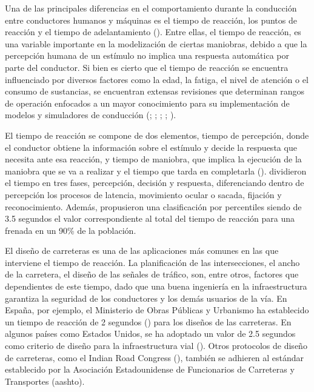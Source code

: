Una de las principales diferencias en el comportamiento durante la conducción entre conductores humanos y máquinas es el tiempo de reacción, los puntos de reacción y el tiempo de adelantamiento (\cite{wagner}). Entre ellas, el tiempo de reacción, es una variable importante en la modelización de ciertas maniobras, debido a que la percepción humana de un estímulo no implica una respuesta automática por parte del conductor. Si bien es cierto que el tiempo de reacción se encuentra influenciado por diversos factores como la edad, la fatiga, el nivel de atención o el consumo de sustancias, se encuentran extensas revisiones que determinan rangos de operación enfocados a un mayor conocimiento para su implementación de modelos y simuladores de conducción (\cite{greenshields}; \cite{sens}; \cite{olson}; \cite{green}; \cite{gartner}).

El tiempo de reacción se compone de dos elementos, tiempo de percepción, donde el conductor obtiene la información sobre el estímulo y decide la respuesta que necesita ante esa reacción, y tiempo de maniobra, que implica la ejecución de la maniobra que se va a realizar y el tiempo que tarda en completarla (\cite{mclaughlin}). \textcite{hooper} dividieron el tiempo en tres fases, percepción, decisión y respuesta, diferenciando dentro de percepción los procesos de latencia, movimiento ocular o sacada, fijación y reconocimiento. Además, propusieron una clasificación por percentiles siendo de 3.5 segundos el valor correspondiente al total del tiempo de reacción para una frenada en un 90\% de la población. 

El diseño de carreteras es una de las aplicaciones más comunes en las que interviene el tiempo de reacción. La planificación de las intersecciones, el ancho de la carretera, el diseño de las señales de tráfico, son, entre otros, factores que dependientes de este tiempo, dado que una buena ingeniería en la infraestructura garantiza la seguridad de los conductores y los demás usuarios de la vía. En España, por ejemplo, el Ministerio de Obras Públicas y Urbanismo ha establecido un tiempo de reacción de 2 segundos (\cite{mopu}) para los diseños de las carreteras. En algunos países como Estados Unidos, se ha adoptado un valor de 2.5 segundos como criterio de diseño para la infraestructura vial (\cite{AASHTO}). Otros protocolos de diseño de carreteras, como el Indian Road Congress (\cite{irc}), también se adhieren al estándar establecido por la Asociación Estadounidense de Funcionarios de Carreteras y Transportes (\gls{aashto}).

